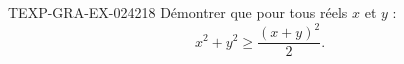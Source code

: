 \begin{exercice}{TEXP-GRA-EX-024}{2}{18}
Démontrer que pour tous réels $x$ et $y$ :
\[ x^2 + y^2 \geq \frac{(x+y)^2}{2}. \]

\end{exercice}
